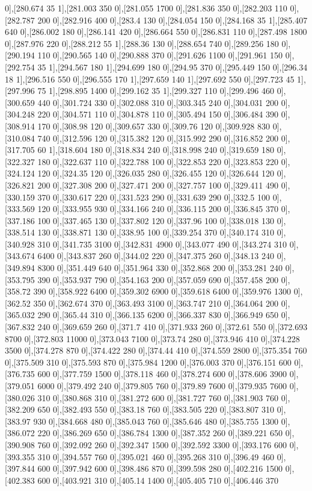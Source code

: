 {0],[280.674 35 1],[281.003 350 0],[281.055 1700 0],[281.836 350 0],[282.203 110 0],[282.787 200 0],[282.916 400 0],[283.4 130 0],[284.054 150 0],[284.168 35 1],[285.407 640 0],[286.002 180 0],[286.141 420 0],[286.664 550 0],[286.831 110 0],[287.498 1800 0],[287.976 220 0],[288.212 55 1],[288.36 130 0],[288.654 740 0],[289.256 180 0],[290.194 110 0],[290.565 140 0],[290.888 370 0],[291.626 1100 0],[291.961 150 0],[292.754 35 1],[294.567 180 1],[294.699 180 0],[294.95 370 0],[295.449 150 0],[296.34 18 1],[296.516 550 0],[296.555 170 1],[297.659 140 1],[297.692 550 0],[297.723 45 1],[297.996 75 1],[298.895 1400 0],[299.162 35 1],[299.327 110 0],[299.496 460 0],[300.659 440 0],[301.724 330 0],[302.088 310 0],[303.345 240 0],[304.031 200 0],[304.248 220 0],[304.571 110 0],[304.878 110 0],[305.494 150 0],[306.484 390 0],[308.914 170 0],[308.98 120 0],[309.657 330 0],[309.76 120 0],[309.928 830 0],[310.084 740 0],[312.596 120 0],[315.382 120 0],[315.992 290 0],[316.852 200 0],[317.705 60 1],[318.604 180 0],[318.834 240 0],[318.998 240 0],[319.659 180 0],[322.327 180 0],[322.637 110 0],[322.788 100 0],[322.853 220 0],[323.853 220 0],[324.124 120 0],[324.35 120 0],[326.035 280 0],[326.455 120 0],[326.644 120 0],[326.821 200 0],[327.308 200 0],[327.471 200 0],[327.757 100 0],[329.411 490 0],[330.159 370 0],[330.617 220 0],[331.523 290 0],[331.639 290 0],[332.5 100 0],[333.569 120 0],[333.955 930 0],[334.166 240 0],[336.115 200 0],[336.845 370 0],[337.186 100 0],[337.465 130 0],[337.802 120 0],[337.96 100 0],[338.018 130 0],[338.514 130 0],[338.871 130 0],[338.95 100 0],[339.254 370 0],[340.174 310 0],[340.928 310 0],[341.735 3100 0],[342.831 4900 0],[343.077 490 0],[343.274 310 0],[343.674 6400 0],[343.837 260 0],[344.02 220 0],[347.375 260 0],[348.13 240 0],[349.894 8300 0],[351.449 640 0],[351.964 330 0],[352.868 200 0],[353.281 240 0],[353.795 390 0],[353.937 790 0],[354.163 200 0],[357.059 690 0],[357.458 200 0],[358.72 390 0],[358.922 6400 0],[359.302 6900 0],[359.618 6400 0],[359.976 1300 0],[362.52 350 0],[362.674 370 0],[363.493 3100 0],[363.747 210 0],[364.064 200 0],[365.032 290 0],[365.44 310 0],[366.135 6200 0],[366.337 830 0],[366.949 650 0],[367.832 240 0],[369.659 260 0],[371.7 410 0],[371.933 260 0],[372.61 550 0],[372.693 8700 0],[372.803 11000 0],[373.043 7100 0],[373.74 280 0],[373.946 410 0],[374.228 3500 0],[374.278 870 0],[374.422 280 0],[374.44 410 0],[374.559 2800 0],[375.354 760 0],[375.509 310 0],[375.593 870 0],[375.984 1200 0],[376.003 370 0],[376.151 600 0],[376.735 600 0],[377.759 1500 0],[378.118 460 0],[378.274 600 0],[378.606 3900 0],[379.051 6000 0],[379.492 240 0],[379.805 760 0],[379.89 7600 0],[379.935 7600 0],[380.026 310 0],[380.868 310 0],[381.272 600 0],[381.727 760 0],[381.903 760 0],[382.209 650 0],[382.493 550 0],[383.18 760 0],[383.505 220 0],[383.807 310 0],[383.97 930 0],[384.668 480 0],[385.043 760 0],[385.646 480 0],[385.755 1300 0],[386.072 220 0],[386.269 650 0],[386.784 1300 0],[387.352 260 0],[389.221 650 0],[390.908 760 0],[392.092 260 0],[392.347 1500 0],[392.592 3300 0],[393.176 600 0],[393.355 310 0],[394.557 760 0],[395.021 460 0],[395.268 310 0],[396.49 460 0],[397.844 600 0],[397.942 600 0],[398.486 870 0],[399.598 280 0],[402.216 1500 0],[402.383 600 0],[403.921 310 0],[405.14 1400 0],[405.405 710 0],[406.446 370 }
